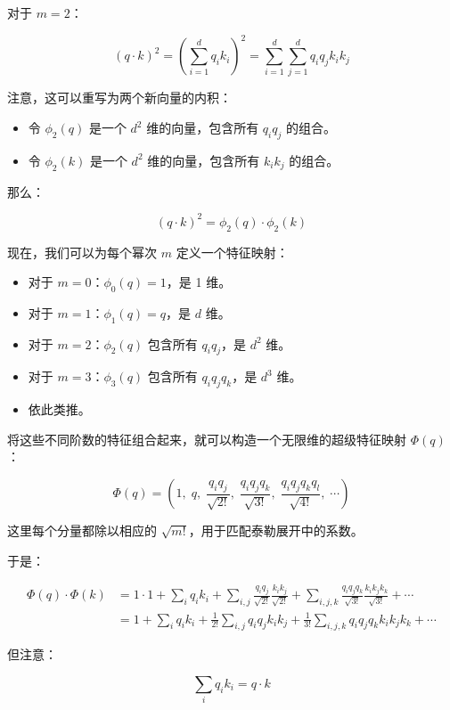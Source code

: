 对于 \(m=2\)：

\[
(q\cdot k)^2
= \left(\sum_{i=1}^{d}q_i k_i\right)^2
= \sum_{i=1}^{d}\sum_{j=1}^{d}q_i q_j k_i k_j
\]

注意，这可以重写为两个新向量的内积：

\begin{itemize}
\tightlist
\item
  令 \(\phi_2(q)\) 是一个 \(d^2\) 维的向量，包含所有 \(q_i q_j\) 的组合。
\item
  令 \(\phi_2(k)\) 是一个 \(d^2\) 维的向量，包含所有 \(k_i k_j\) 的组合。
\end{itemize}

那么：

\[
(q\cdot k)^2 = \phi_2(q)\cdot\phi_2(k)
\]

现在，我们可以为每个幂次 \(m\) 定义一个特征映射：

\begin{itemize}
\tightlist
\item
  对于 \(m=0\)：\(\phi_0(q)=1\)，是 1 维。
\item
  对于 \(m=1\)：\(\phi_1(q)=q\)，是 \(d\) 维。
\item
  对于 \(m=2\)：\(\phi_2(q)\) 包含所有 \(q_i q_j\)，是 \(d^2\) 维。
\item
  对于 \(m=3\)：\(\phi_3(q)\) 包含所有 \(q_i q_j q_k\)，是 \(d^3\) 维。
\item
  依此类推。
\end{itemize}

将这些不同阶数的特征组合起来，就可以构造一个无限维的超级特征映射 \(\Phi(q)\)：

\[
\Phi(q)=
\left(
1,\;
q,\;
\frac{q_i q_j}{\sqrt{2!}},\;
\frac{q_i q_j q_k}{\sqrt{3!}},\;
\frac{q_i q_j q_k q_l}{\sqrt{4!}},\;
\cdots
\right)
\]

这里每个分量都除以相应的 \(\sqrt{m!}\)，用于匹配泰勒展开中的系数。

于是：

\[
\begin{aligned}
\Phi(q)\cdot\Phi(k)
&= 1\cdot 1
+ \sum_i q_i k_i
+ \sum_{i,j}\frac{q_i q_j}{\sqrt{2!}}\frac{k_i k_j}{\sqrt{2!}}
+ \sum_{i,j,k}\frac{q_i q_j q_k}{\sqrt{3!}}\frac{k_i k_j k_k}{\sqrt{3!}}
+ \cdots \\
&= 1 + \sum_i q_i k_i
+ \frac{1}{2!}\sum_{i,j}q_i q_j k_i k_j
+ \frac{1}{3!}\sum_{i,j,k}q_i q_j q_k k_i k_j k_k
+ \cdots
\end{aligned}
\]

但注意：

\[
\sum_i q_i k_i = q\cdot k
\]

